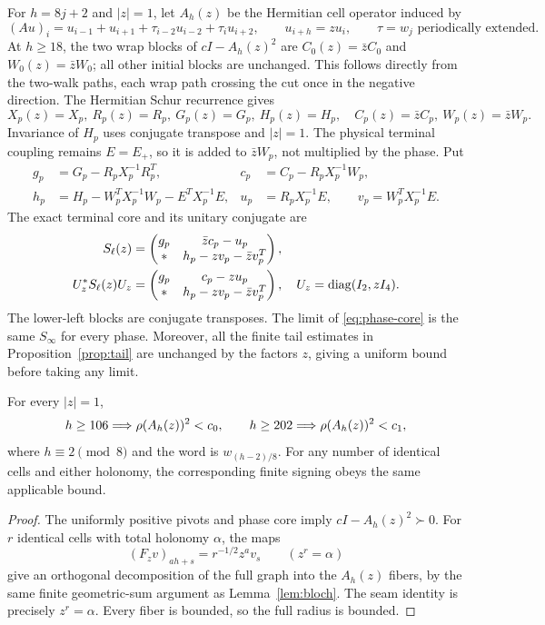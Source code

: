 For $h=8j+2$ and $|z|=1$, let $A_h(z)$ be the Hermitian cell operator
induced by
\[
 (Au)_i=u_{i-1}+u_{i+1}+\tau_{i-2}u_{i-2}+\tau_i u_{i+2},
 \qquad u_{i+h}=zu_i,\qquad \tau=w_j\text{ periodically extended}.
\]
At $h\ge18$, the two wrap blocks of $cI-A_h(z)^2$ are
$C_0(z)=\bar z C_0$ and $W_0(z)=\bar z W_0$; all other initial blocks
are unchanged. This follows directly from the two-walk paths, each wrap
path crossing the cut once in the negative direction.
The Hermitian Schur recurrence gives
\[
 X_p(z)=X_p,\ R_p(z)=R_p,\ G_p(z)=G_p,\ H_p(z)=H_p,
 \quad C_p(z)=\bar z C_p,\ W_p(z)=\bar z W_p.
\]
Invariance of $H_p$ uses conjugate transpose and $|z|=1$.
The physical terminal coupling remains $E=E_+$, so it is added to
$\bar zW_p$, not multiplied by the phase. Put
\begin{align*}
 g_p&=G_p-R_pX_p^{-1}R_p^T,&
 c_p&=C_p-R_pX_p^{-1}W_p,\\
 h_p&=H_p-W_p^TX_p^{-1}W_p-E^TX_p^{-1}E,&
 u_p&=R_pX_p^{-1}E,\qquad v_p=W_p^TX_p^{-1}E.
\end{align*}
The exact terminal core and its unitary conjugate are
\begin{align}
 S_\ell(z)&=\begin{pmatrix}
 g_p&\bar z c_p-u_p\\ *&h_p-zv_p-\bar z v_p^T
 \end{pmatrix},\notag\\
 U_z^*S_\ell(z)U_z&=\begin{pmatrix}
 g_p&c_p-zu_p\\ *&h_p-zv_p-\bar z v_p^T
 \end{pmatrix},\quad U_z=\operatorname{diag}(I_2,zI_4).
 \label{eq:phase-core}
\end{align}
The lower-left blocks are conjugate transposes. The limit of
\eqref{eq:phase-core} is the same $S_\infty$ for every phase. Moreover,
all the finite tail estimates in Proposition~\ref{prop:tail} are unchanged
by the factors $z$, giving a uniform bound before taking any limit.

\begin{corollary}\label{cor:phase}
For every $|z|=1$,
\[
 h\ge106\Longrightarrow\rho(A_h(z))^2<c_0,
 \qquad h\ge202\Longrightarrow\rho(A_h(z))^2<c_1,
\]
where $h\equiv2\pmod8$ and the word is $w_{(h-2)/8}$.
For any number of identical cells and either holonomy, the corresponding
finite signing obeys the same applicable bound.
\end{corollary}
\begin{proof}
The uniformly positive pivots and phase core imply $cI-A_h(z)^2\succ0$.
For $r$ identical cells with total holonomy $\alpha$, the maps
\[
 (F_zv)_{ah+s}=r^{-1/2}z^a v_s\qquad(z^r=\alpha)
\]
give an orthogonal decomposition of the full graph into the $A_h(z)$
fibers, by the same finite geometric-sum argument as
Lemma~\ref{lem:bloch}. The seam identity is precisely $z^r=\alpha$.
Every fiber is bounded, so the full radius is bounded.
\end{proof}
